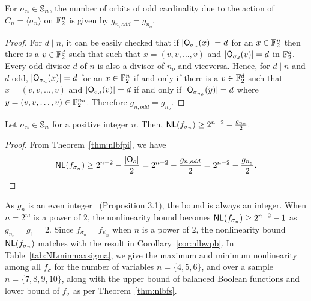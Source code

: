 \documentclass{llncs}
\begin{document}
\begin{theorem}\label{thm:oddorbs}
For $\sigma_n \in \mathbb{S}_n$, the number of orbits of odd cardinality due to the action of $C_n = \langle\sigma_n\rangle$ on $\mathbb{F}_2^n$ is given by
$g_{n,odd} = g_{n_o}$.
\end{theorem}

\begin{proof}
For $d \mid n$, it can be easily checked that if $|\mathsf{O}_{\sigma_n}(x)| = d$ for an $x \in \mathbb{F}_2^n$ then there is a $v \in \mathbb{F}_2^d$ such that such that $x = (v,v, \ldots, v)$ and $|\mathsf{O}_{\sigma_d}(v)| = d$ in $\mathbb{F}_2^d$.
Every odd divisor $d$ of $n$ is also a divisor of $n_o$ and viceversa. 
Hence, for $d\mid n$ and $d$ odd, $|\mathsf{O}_{\sigma_n}(x)| = d$ for an $x\in \mathbb{F}_2^n$ if and only if there is a $v \in \mathbb{F}_2^d$ such that $x = (v,v, \ldots, v)$ and $|\mathsf{O}_{\sigma_d}(v)| = d$ if and only if $|\mathsf{O}_{\sigma_{n_o}}(y)| = d$ where $y = (v,v, \ldots, v) \in \mathbb{F}_2^{n_o}$. 
Therefore $g_{n,odd} = g_{n_o}$.
\end{proof}

\begin{theorem}\label{thm:nlbfs}
Let $\sigma_n \in \mathbb{S}_n$ for a positive integer $n$.
Then, $\mathsf{NL}(f_{\sigma_n}) \ge 2^{n-2} - \frac{g_{n_o}}{2}$.
\end{theorem}
\begin{proof}
From Theorem~\ref{thm:nlbfpi}, we have
$$\mathsf{NL}(f_{\sigma_n}) \ge 2^{n-2} - \frac{|\mathsf{O}_o|}{2} = 2^{n-2} - \frac{g_{n,odd}}{2} = 2^{n-2} - \frac{g_{n_o}}{2}.$$
\end{proof}
As $g_n$ is an even integer~\cite{DM:CI18} (Proposition 3.1), the bound is always an integer. 
When $n = 2^m$ is a power of $2$, the nonlinearity bound becomes $\mathsf{NL}(f_{\sigma_n}) \ge 2^{n-2} - 1$ as $g_{n_o} = g_1 = 2$. 
Since $f_{\sigma_n} = f_{\psi_n}$ when $n$ is a power of $2$, the nonlinearity bound $\mathsf{NL}(f_{\sigma_n})$ matches with the result in Corollary~\ref{cor:nlbwpb}. 
In Table~\ref{tab:NLminmaxsigma}, we give the maximum and minimum nonlinearity among all $f_\sigma$ for the number of variables $n = \{4, 5, 6\}$, and over a sample $n = \{7, 8, 9, 10\}$, along with the upper bound of balanced Boolean functions and lower bound of $f_{\sigma}$ as per Theorem~\ref{thm:nlbfs}.
\end{document}
